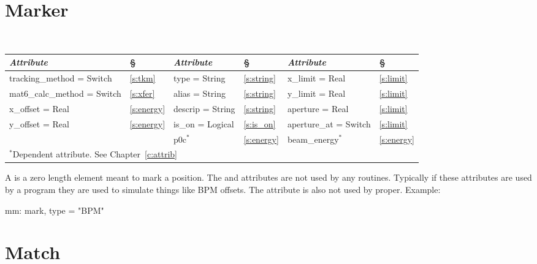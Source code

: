 {{%
\section{Marker}
\label{s:mark}

\begin{center}
\tt
\begin{tabular}{|l|l||l|l||l|l|} \hline
  {\sl Attribute} & \S  & {\sl Attribute} & \S & {\sl Attribute} & \S \\ \hline
  tracking\_method = Switch    & \ref{s:tkm}    &  type = String    & \ref{s:string} & x\_limit = Real       & \ref{s:limit}  \\ \hline 
  mat6\_calc\_method = Switch  & \ref{s:xfer}   &  alias = String   & \ref{s:string} & y\_limit = Real       & \ref{s:limit}  \\ \hline 
  x\_offset = Real             & \ref{s:energy} &  descrip = String & \ref{s:string} & aperture = Real       & \ref{s:limit}  \\ \hline 
  y\_offset = Real             & \ref{s:energy} &  is\_on = Logical & \ref{s:is_on}  & aperture\_at = Switch & \ref{s:limit}  \\ \hline
                               &                & p0c$^*$           & \ref{s:energy} & beam\_energy$^*$      & \ref{s:energy} \\ \hline
  \multicolumn{6}{l}{\small $^*$Dependent attribute. See Chapter~\ref{c:attrib}} \\
\end{tabular}
\end{center}
\toffset

A  is a zero length element meant to mark a position. The
 and  attributes are not used by any \bmad
routines. Typically if these attributes are used by a program they are
used to simulate things like BPM offsets. The  attribute is
also not used by \bmad proper. Example:
\begin{example}
  mm: mark, type = "BPM"
\end{example}

\section{Match}
\label{s:match}

}}
